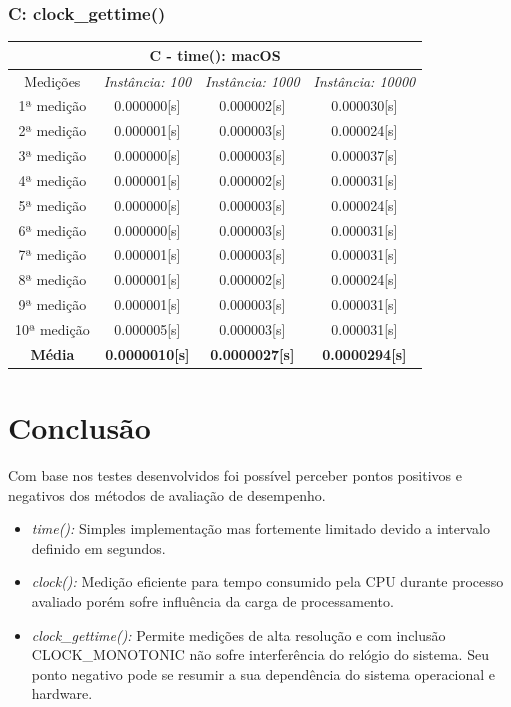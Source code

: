 \documentclass[12pt,a4paper,titlepage]{article}
\begin{document}
\subsubsection{C: clock\_gettime()}
\begin{center}
    \begin{tabular}{||c|c|c|c||}
        \hline
        \multicolumn{4}{||c||}{\textbf{C - time(): macOS}}\\
        \hline \hline
        Medições & \textit{Instância: 100} & \textit{Instância: 1000} & \textit{Instância: 10000}\\
        \hline
        1ª medição & 0.000000[s] & 0.000002[s] & 0.000030[s]\\
        \hline
        2ª medição & 0.000001[s] & 0.000003[s] & 0.000024[s]\\
        \hline
        3ª medição & 0.000000[s] & 0.000003[s] & 0.000037[s]\\
        \hline
        4ª medição & 0.000001[s] & 0.000002[s] & 0.000031[s]\\
        \hline
        5ª medição & 0.000000[s] & 0.000003[s] & 0.000024[s]\\
        \hline
        6ª medição & 0.000000[s] & 0.000003[s] & 0.000031[s]\\
        \hline
        7ª medição & 0.000001[s] & 0.000003[s] & 0.000031[s]\\
        \hline
        8ª medição & 0.000001[s] & 0.000002[s] & 0.000024[s]\\
        \hline
        9ª medição & 0.000001[s] & 0.000003[s] & 0.000031[s]\\
        \hline
        10ª medição & 0.000005[s] & 0.000003[s] & 0.000031[s]\\
        \hline
        \textbf{Média} & \textbf{0.0000010[s]} & \textbf{0.0000027[s]} & \textbf{0.0000294[s]}\\
        \hline
    \end{tabular}
\end{center}

\section{Conclusão}
Com base nos testes desenvolvidos foi possível perceber pontos positivos e negativos dos métodos de avaliação de desempenho.
\begin{itemize}
    \item \textit{time():} Simples implementação mas fortemente limitado devido a intervalo definido em segundos.
    \item \textit{clock():} Medição eficiente para tempo consumido pela CPU durante processo avaliado porém sofre influência da carga de processamento.
    \item 
        \textit{clock\_gettime():} Permite medições de alta resolução e com inclusão CLOCK\_MONOTONIC não sofre interferência do relógio do sistema.
        Seu ponto negativo pode se resumir a sua dependência do sistema operacional e hardware.
\end{itemize}
\end{document}
